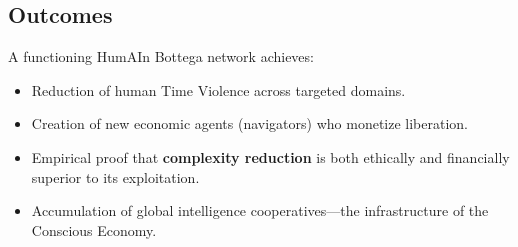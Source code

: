 \subsection{Outcomes}
\label{sec:impl-outcomes}

A functioning HumAIn Bottega network achieves:

\begin{itemize}
    \item Reduction of human Time Violence across targeted domains.
    \item Creation of new economic agents (navigators) who monetize liberation.
    \item Empirical proof that \textbf{complexity reduction} is both ethically and financially superior to its exploitation.
    \item Accumulation of global intelligence cooperatives—the infrastructure of the Conscious Economy.
\end{itemize}
